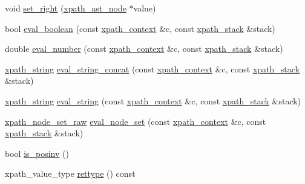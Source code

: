\begin{DoxyCompactItemize}
\item 
void \hyperlink{classxpath__ast__node_afe044146db852b7d4dbf188fd2ff6c75}{set\-\_\-right} (\hyperlink{classxpath__ast__node}{xpath\-\_\-ast\-\_\-node} $\ast$value)
\item 
bool \hyperlink{classxpath__ast__node_ab7f965a92023bc2704b8e6fd9f3d7c14}{eval\-\_\-boolean} (const \hyperlink{structxpath__context}{xpath\-\_\-context} \&c, const \hyperlink{structxpath__stack}{xpath\-\_\-stack} \&stack)
\item 
double \hyperlink{classxpath__ast__node_a92dd7048e28d486bc7f382d1fc6f1de6}{eval\-\_\-number} (const \hyperlink{structxpath__context}{xpath\-\_\-context} \&c, const \hyperlink{structxpath__stack}{xpath\-\_\-stack} \&stack)
\item 
\hyperlink{classxpath__string}{xpath\-\_\-string} \hyperlink{classxpath__ast__node_aaf931a091af0fb91c25e90b205363b4e}{eval\-\_\-string\-\_\-concat} (const \hyperlink{structxpath__context}{xpath\-\_\-context} \&c, const \hyperlink{structxpath__stack}{xpath\-\_\-stack} \&stack)
\item 
\hyperlink{classxpath__string}{xpath\-\_\-string} \hyperlink{classxpath__ast__node_a6b675237a590548b68d0e0b97518b6df}{eval\-\_\-string} (const \hyperlink{structxpath__context}{xpath\-\_\-context} \&c, const \hyperlink{structxpath__stack}{xpath\-\_\-stack} \&stack)
\item 
\hyperlink{classxpath__node__set__raw}{xpath\-\_\-node\-\_\-set\-\_\-raw} \hyperlink{classxpath__ast__node_a30d98ec97e3129e82ac9ec3f2a759855}{eval\-\_\-node\-\_\-set} (const \hyperlink{structxpath__context}{xpath\-\_\-context} \&c, const \hyperlink{structxpath__stack}{xpath\-\_\-stack} \&stack)
\item 
bool \hyperlink{classxpath__ast__node_a9253f88832441a357ea65639c73a34be}{is\-\_\-posinv} ()
\item 
xpath\-\_\-value\-\_\-type \hyperlink{classxpath__ast__node_a2c3598521141ed4b763fe6c4f852234f}{rettype} () const 
\end{DoxyCompactItemize}


